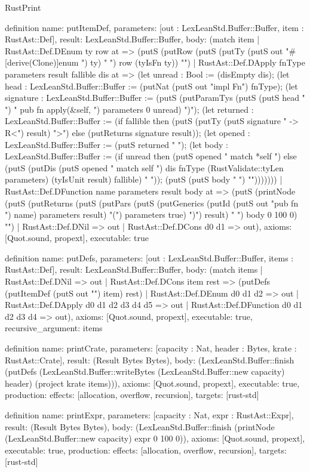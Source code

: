 \begin{lexlean}{RustPrint}
\begin{semanticmodule}
definition{
  name: putItemDef,
  parameters: [out : LexLeanStd.Buffer::Buffer, item : RustAst::Def],
  result: LexLeanStd.Buffer::Buffer,
  body: (match item
    | RustAst::Def.DEnum ty row at => (putS (putRow (putS (putTy (putS out "#[derive(Clone)]\npub enum ") ty) " {\n") row (tyIsFn ty)) "}\n")
    | RustAst::Def.DApply fnType parameters result fallible dis at => (let unread : Bool := (disEmpty dis); (let head : LexLeanStd.Buffer::Buffer := (putNat (putS out "impl Fn") fnType); (let signature : LexLeanStd.Buffer::Buffer := (putS (putParamTys (putS (putS head " {\n") "    pub fn apply(&self, ") parameters 0 unread) ")"); (let returned : LexLeanStd.Buffer::Buffer := (if fallible then (putS (putTy (putS signature " -> R<") result) ">") else (putReturns signature result)); (let opened : LexLeanStd.Buffer::Buffer := (putS returned " {\n"); (let body : LexLeanStd.Buffer::Buffer := (if unread then (putS opened "        match *self {}\n") else (putS (putDis (putS opened "        match self {\n") dis fnType (RustValidate::tyLen parameters) (tyIsUnit result) fallible) "        }\n")); (putS (putS body "    }\n") "}\n")))))))
    | RustAst::Def.DFunction name parameters result body at => (putS (printNode (putS (putReturns (putS (putPars (putS (putGenerics (putId (putS out "pub fn ") name) parameters result) "(") parameters true) ")") result) " ") body 0 100 0) "\n")
    | RustAst::Def.DNil => out
    | RustAst::Def.DCons d0 d1 => out),
  axioms: [Quot.sound, propext],
  executable: true
}

definition{
  name: putDefs,
  parameters: [out : LexLeanStd.Buffer::Buffer, items : RustAst::Def],
  result: LexLeanStd.Buffer::Buffer,
  body: (match items
    | RustAst::Def.DNil => out
    | RustAst::Def.DCons item rest => (putDefs (putItemDef (putS out "\n") item) rest)
    | RustAst::Def.DEnum d0 d1 d2 => out
    | RustAst::Def.DApply d0 d1 d2 d3 d4 d5 => out
    | RustAst::Def.DFunction d0 d1 d2 d3 d4 => out),
  axioms: [Quot.sound, propext],
  executable: true,
  recursive_argument: items
}

definition{
  name: printCrate,
  parameters: [capacity : Nat, header : Bytes, krate : RustAst::Crate],
  result: (Result Bytes Bytes),
  body: (LexLeanStd.Buffer::finish (putDefs (LexLeanStd.Buffer::writeBytes (LexLeanStd.Buffer::new capacity) header) (project krate items))),
  axioms: [Quot.sound, propext],
  executable: true,
  production: {effects: [allocation, overflow, recursion], targets: [rust-std]}
}

definition{
  name: printExpr,
  parameters: [capacity : Nat, expr : RustAst::Expr],
  result: (Result Bytes Bytes),
  body: (LexLeanStd.Buffer::finish (printNode (LexLeanStd.Buffer::new capacity) expr 0 100 0)),
  axioms: [Quot.sound, propext],
  executable: true,
  production: {effects: [allocation, overflow, recursion], targets: [rust-std]}
}
\end{semanticmodule}
\end{lexlean}
